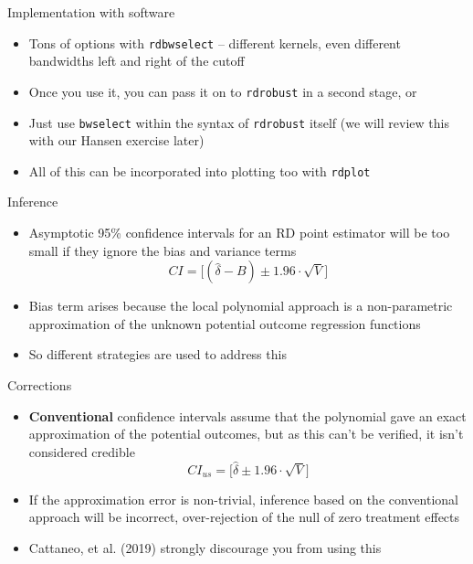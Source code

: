 \documentclass{beamer}
\begin{document}
\begin{frame}{Implementation with software}

\begin{itemize}
\item Tons of options with \texttt{rdbwselect} -- different kernels, even different bandwidths left and right of the cutoff
\item Once you use it, you can pass it on to \texttt{rdrobust} in a second stage, or
\item Just use \texttt{bwselect} within the syntax of \texttt{rdrobust} itself (we will review this with our Hansen exercise later)
\item All of this can be incorporated into plotting too with \texttt{rdplot}
\end{itemize}

\end{frame}


\begin{frame}{Inference}

\begin{itemize}
\item Asymptotic 95\% confidence intervals for an RD point estimator will be too small if they ignore the bias and variance terms$$CI=\bigg [ ( \widehat{\delta} - B) \pm 1.96 \cdot \sqrt{V} \bigg ]$$
\item Bias term arises because the local polynomial approach is a non-parametric approximation of the unknown potential outcome regression functions
\item So different strategies are used to address this 
\end{itemize}

\end{frame}

\begin{frame}{Corrections}
\begin{itemize}
\item \textbf{Conventional} confidence intervals assume that the polynomial gave an exact approximation of the potential outcomes, but as this can't be verified, it isn't considered credible $$CI_{us}=\bigg [ \widehat{\delta}  \pm 1.96 \cdot \sqrt{V} \bigg ]$$
\item If the approximation error is non-trivial, inference based on the conventional approach will be incorrect, over-rejection of the null of zero treatment effects
\item Cattaneo, et al. (2019) strongly discourage you from using this
\end{itemize}

\end{frame}
\end{document}
